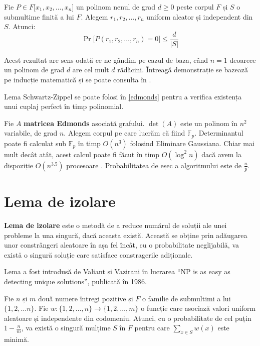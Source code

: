\begin{thm}
  Fie $P \in F \lbrack x_{1}, x_{2}, \ldots, x_{n} \rbrack$ un polinom nenul de grad $d \geq 0$
  peste corpul $F$ și $S$ o submultime finită a lui $F$. Alegem
  $r_{1}, r_{2}, \ldots, r_{n}$ uniform aleator și independent din $S$. Atunci:
  \begin{equation}
    \Pr \lbrack P(r_{1}, r_{2}, \ldots, r_{n}) = 0 \rbrack \leq \frac{d}{|S|}
  \end{equation}
\end{thm}

Acest rezultat are sens odată ce ne gândim pe cazul de baza, când $n=1$ deoarece
un polinom de grad $d$ are cel mult $d$ rădăcini. Întreagă demonstrație se
bazează pe inducție matematică și se poate consulta în \cite{schwartzzippel}.

\begin{thm}
  Lema Schwartz-Zippel se poate folosi în \ref{edmonds} pentru a verifica
  existența unui cuplaj perfect în timp polinomial.
\end{thm}

Fie $A$ \textbf{matricea Edmonds} asociată grafului. $\det(A)$ este un polinom
în $n^{2}$ variabile, de grad $n$. Alegem corpul pe care lucrăm că fiind
$\mathbb{F}_{p}$. Determinantul poate fi calculat sub $\mathbb{F}_{p}$ în timp $O(n^{3})$
folosind Eliminare Gaussiana. Chiar mai mult decât atât, acest calcul
poate fi făcut în timp $O(\log^{2} n)$ dacă avem la dispoziție $O(n^{3.5})$
procesoare \cite{paralleldet}. Probabilitatea de eșec a algoritmului este de $\frac{n}{p}$.

\pagebreak

\section{Lema de izolare}
\textbf{Lema de izolare} este o metodă de a reduce numărul de soluții ale unei
probleme la una singură, dacă aceasta există. Această se obține prin adăugarea
unor constrângeri aleatoare în așa fel încât, cu o probabilitate neglijabilă,
va există o singură soluție care satisface constragerile adiționale.

Lema a fost introdusă de Valiant și Vazirani în lucrarea ``NP is as easy as
detecting unique solutions'', publicată în 1986.

\begin{thm}
  \label{isolation}
  Fie $n$ și $m$ două numere întregi pozitive și $F$ o familie de submultimi a
  lui $\{1, 2, \ldots n\}$. Fie
  $w : \{1, 2, \ldots, n\} \to \{1, 2, \ldots, m\}$ o funcție care asociază
  valori uniform aleatoare și independente din codomeniu. Atunci, cu o
  probabilitate de cel puțin $1 - \frac{n}{m}$, va există o singură mulțime $S$ în
  $F$ pentru care $\displaystyle\sum\limits_{x\in S}{w(x)}$ este minimă.
\end{thm}

